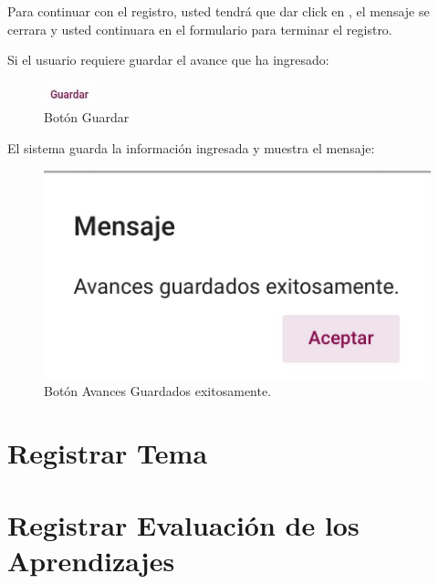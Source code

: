 Para continuar con el registro, usted tendrá que  dar click en , el mensaje se cerrara y usted continuara
en el formulario para terminar el registro.

\pagebreak
Si el usuario requiere guardar el avance que ha ingresado:

\begin{figure}[H]
    \centering
    \includegraphics[width=0.1\linewidth]{images/SP6/BotonGuardar.jpeg}
    \caption{Botón Guardar}
\end{figure}

El sistema guarda la información ingresada y muestra el mensaje:

\begin{figure}[H]
    \centering
    \includegraphics[width=0.4\linewidth]{images/SP6/BotonAvance.jpeg}
    \caption{Botón Avances Guardados exitosamente.}
\end{figure}


\pagebreak

\hypertarget{RegistrarTema}{\section{Registrar Tema}}
\pagebreak
\hypertarget{REA}{\section{Registrar Evaluación de los Aprendizajes}}
\pagebreak



